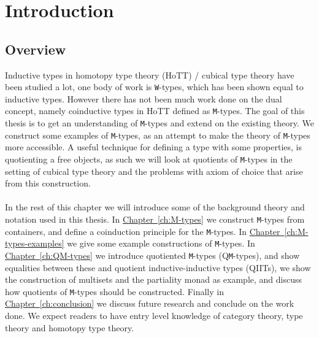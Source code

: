 \documentclass[twoside,11pt,openright]{report}
\theoremstyle{plain} %
\theoremstyle{definition}
\theoremstyle{remark}
\newcommand*{\chapterref}[1]{\hyperref[ch:#1]{Chapter~\ref*{ch:#1}}}
\begin{document}
\chapter{Introduction} %
\label{ch:intro}

\section{Overview}
Inductive types in homotopy type theory (HoTT) / cubical type theory have been studied a lot, one body of work is \texttt{W}-types, which has been shown equal to inductive types. However there has not been much work done on the dual concept, namely coinductive types in HoTT defined as \texttt{M}-types. The goal of this thesis is to get an understanding of \texttt{M}-types and extend on the existing theory. We construct some examples of \texttt{M}-types, as an attempt to make the theory of \texttt{M}-types more accessible. A useful technique for defining a type with some properties, is quotienting a free objects, as such we will look at quotients of \texttt{M}-types in the setting of cubical type theory and the problems with axiom of choice that arise from this construction.
\\ \\
In the rest of this chapter we will introduce some of the background theory and notation used in this thesis. In \chapterref{M-types} we construct \texttt{M}-types from containers, and define a coinduction principle for the \texttt{M}-types. In \chapterref{M-types-examples} we give some example constructions of \texttt{M}-types. In \chapterref{QM-types} we introduce quotiented \texttt{M}-types (Q\texttt{M}-types), and show equalities between these and quotient inductive-inductive types (QIITs), we show the construction of multisets and the partiality monad as example, and discuss how quotients of \texttt{M}-types should be constructed. Finally in \chapterref{conclusion} we discuss future research and conclude on the work done.
We expect readers to have entry level knowledge of category theory, type theory and homotopy type theory.
\end{document}
